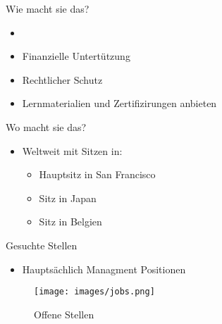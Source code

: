 \documentclass[11pt,aspectratio=169]{beamer}
\begin{document}
\begin{frame}{Wie macht sie das?}
	\begin{itemize}
		\item <1->
		\item <2->Finanzielle Untertützung
		\item <3->Rechtlicher Schutz
		\item <4->Lernmaterialien und Zertifizirungen anbieten\cite{Training}
	\end{itemize}
\end{frame}
\begin{frame}{Wo macht sie das?}
	\begin{itemize}
		\item Weltweit mit Sitzen in:
		      \begin{itemize}
			      \item Hauptsitz in San Francisco \cite{Locations}
			      \item Sitz in Japan\cite{Locations}
			      \item Sitz in Belgien\cite{Locations}
		      \end{itemize}
	\end{itemize}
\end{frame}
\begin{frame}{Gesuchte Stellen}
	\begin{itemize}

		\item	Hauptsächlich Managment Positionen
	\end{itemize}
	\begin{figure}
		\centering
		\texttt{[image: images/jobs.png]}\cite{Positionen}
		\caption{Offene Stellen}
	\end{figure}

\end{frame}
\end{document}
